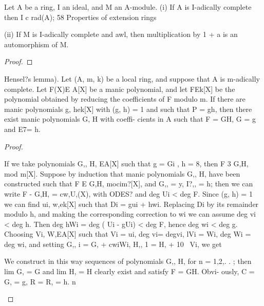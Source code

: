 \begin{theorem}[Theorem 8.2]\label{mcrt-auto-theorem-8-2}\uses{}
\begin{mathematicalrecord}
Let A be a ring, I an ideal, and M an A-module.
  (i) If A is I-adically complete then I c rad(A);
58       Properties   of extension rings

   (ii) If M is I-adically complete and awl, then multiplication  by 1 + a is an
automorphism of M.
\end{mathematicalrecord}
\end{theorem}
\begin{proof}
\end{proof}


\begin{theorem}[Theorem 8.3]\label{mcrt-auto-theorem-8-3}\uses{}
\begin{mathematicalrecord}
Hensel?s lemma). Let (A, m, k) be a local ring, and suppose
that A is m-adically complete. Let F(X)E A[X] be a manic polynomial, and
let FEk[X]     be the polynomial obtained by reducing the coefficients of F
modulo m. If there are manic polynomials g, hek[X]               with (g, h) = 1
and such that P = gh, then there exist manic polynomials G, H with coeffi-
cients in A such that F = GH, G = g and E7= h.
\end{mathematicalrecord}
\end{theorem}
\begin{proof}
\begin{mathematicalrecord}
If we take polynomials G,, H, EA[X] such that g = Gi , h = 8, then
F 3 G,H, mod m[X]. Suppose by induction that manic polynomials G,,
H, have been constructed such that F E G,H, mocim?[X],              and G,, = y,
I?,, = h; then we can write
           F - G,H, = cw,U,(X),        with ODES? and deg Ui < deg F.
Since (g, h) = 1 we can find ui, w,ek[X]    such that Di = gui + hwi. Replacing
Di by its remainder modulo h, and making the corresponding correction to
wi we can assume deg vi < deg h. Then
           deg hWi = deg ( Ui - gUi) < deg F, hence deg wi < deg g.
Choosing Vi, W,EA[X]            such that Vi = ui, deg vi= degvi, lVi = Wi,
deg Wi = deg wi, and setting G,, i = G, + cwiWi, H,, 1 = H, + 10~ Vi,
we get

We construct in this way sequences of polynomials G,, H, for n = 1,2,. . ;
then lim G, = G and lim H, = H clearly exist and satisfy F = GH. Obvi-
ously, C = G, = g, R = R, = h. n
\end{mathematicalrecord}
\end{proof}


